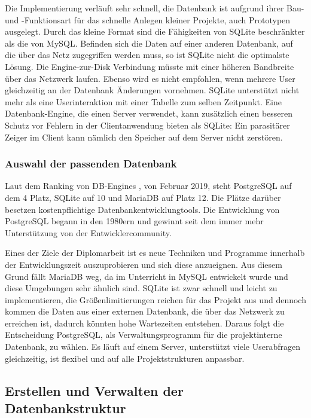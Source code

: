 Die Implementierung verläuft sehr schnell, die Datenbank ist aufgrund ihrer Bau- und -Funktionsart für das schnelle Anlegen kleiner Projekte, auch Prototypen ausgelegt. Durch das kleine Format sind die Fähigkeiten von SQLite beschränkter als die von MySQL\cite{SQLiteLimitierungen}. Befinden sich die Daten auf einer anderen Datenbank, auf die über das Netz zugegriffen werden muss, so ist SQLite nicht die optimalste Lösung. Die Engine-zur-Disk Verbindung müsste mit einer höheren Bandbreite über das Netzwerk laufen. Ebenso wird es nicht empfohlen, wenn mehrere User gleichzeitig an der Datenbank Änderungen vornehmen. SQLite unterstützt nicht mehr als eine Userinteraktion mit einer Tabelle zum selben Zeitpunkt. Eine Datenbank-Engine, die einen Server verwendet, kann zusätzlich einen besseren Schutz vor Fehlern in der Clientanwendung bieten als SQLite: Ein parasitärer Zeiger im Client kann nämlich den Speicher auf dem Server nicht zerstören.

\subsubsection{Auswahl der passenden Datenbank} 
Laut dem Ranking von DB-Engines \cite{DBRanking}, von Februar 2019, steht PostgreSQL auf dem 4 Platz, SQLite auf 10 und MariaDB auf Platz 12. Die Plätze darüber besetzen kostenpflichtige Datenbankentwicklungtools. Die Entwicklung von PostgreSQL begann in den 1980ern und gewinnt seit dem immer mehr Unterstützung von der Entwicklercommunity. 

Eines der Ziele der Diplomarbeit ist es neue Techniken und Programme innerhalb der Entwicklungszeit auszuprobieren und sich diese anzueignen. Aus diesem Grund fällt MariaDB weg, da im Unterricht in MySQL entwickelt wurde und diese Umgebungen sehr ähnlich sind. SQLite ist zwar schnell und leicht zu implementieren, die Größenlimitierungen reichen für das Projekt aus und dennoch kommen die Daten aus einer externen Datenbank, die über das Netzwerk zu erreichen ist, dadurch könnten hohe Wartezeiten entstehen. Daraus folgt die Entscheidung PostgreSQL, als Verwaltungsprogramm für die projektinterne Datenbank, zu wählen. Es läuft auf einem Server, unterstützt viele Userabfragen gleichzeitig, ist flexibel und auf alle Projektstrukturen anpassbar. 

\subsection{Erstellen und Verwalten der Datenbankstruktur}

